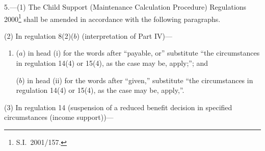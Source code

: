 \documentclass[12pt,a4paper]{article}
\begin{document}
5.---(1)  The Child Support (Maintenance Calculation Procedure) Regulations 2000\footnote{S.I.\ 2001/157.} shall be amended in accordance with the following paragraphs.

(2) In regulation 8(2)($b$)  (interpretation of Part IV)—
\begin{enumerate}\item[]
($a$) in head (i)  for the words after “payable, or” substitute “the circumstances in regulation 14(4) or 15(4), as the case may be, apply;”; and

($b$) in head (ii)  for the words after “given,” substitute “the circumstances in regulation 14(4) or 15(4), as the case may be, apply,”.
\end{enumerate}

(3) In regulation 14 (suspension of a reduced benefit decision in specified circumstances (income support))—
\end{document}
